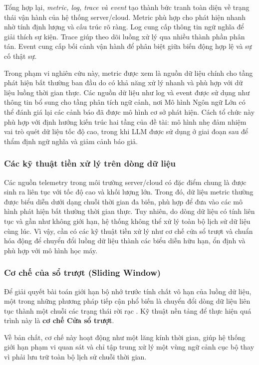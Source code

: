 Tổng hợp lại, \textit{metric, log, trace và event} tạo thành bức tranh toàn diện về trạng thái vận hành của hệ thống server/cloud. Metric phù hợp cho phát hiện nhanh nhờ tính định lượng và cấu trúc rõ ràng. Log cung cấp thông tin ngữ nghĩa để giải thích sự kiện. Trace giúp theo dõi luồng xử lý qua nhiều thành phần phân tán. Event cung cấp bối cảnh vận hành để phân biệt giữa biến động hợp lệ và sự cố thật sự.

Trong phạm vi nghiên cứu này, metric được xem là nguồn dữ liệu chính cho tầng phát hiện bất thường ban đầu do có khả năng xử lý nhanh và phù hợp với dữ liệu luồng thời gian thực. Các nguồn dữ liệu như log và event được sử dụng như thông tin bổ sung cho tầng phân tích ngữ cảnh, nơi Mô hình Ngôn ngữ Lớn có thể đánh giá lại các cảnh báo đã được mô hình cơ sở phát hiện. Cách tổ chức này phù hợp với định hướng kiến trúc hai tầng của đề tài: mô hình nhẹ đảm nhiệm vai trò quét dữ liệu tốc độ cao, trong khi LLM được sử dụng ở giai đoạn sau để thẩm định ngữ nghĩa và giảm cảnh báo giả.

\subsubsection{Các kỹ thuật tiền xử lý trên dòng dữ liệu}
    Các nguồn telemetry trong môi trường server/cloud có đặc điểm chung là được sinh ra liên tục với tốc độ cao và khối lượng lớn. Trong đó, dữ liệu metric thường được biểu diễn dưới dạng chuỗi thời gian đa biến, phù hợp để đưa vào các mô hình phát hiện bất thường thời gian thực. Tuy nhiên, do dòng dữ liệu có tính liên tục và gần như không giới hạn, hệ thống không thể xử lý toàn bộ lịch sử dữ liệu cùng lúc. Vì vậy, cần có các kỹ thuật tiền xử lý như cơ chế cửa sổ trượt và chuẩn hóa động để chuyển đổi luồng dữ liệu thành các biểu diễn hữu hạn, ổn định và phù hợp với mô hình học máy.
    
    \subsubsection*{Cơ chế của sổ trượt (Sliding Window)}
        
    Để giải quyết bài toán giới hạn bộ nhớ trước tính chất vô hạn của luồng dữ liệu, một trong những phương pháp tiếp cận phổ biến là chuyển đổi dòng dữ liệu liên tục thành một chuỗi các trạng thái rời rạc . Kỹ thuật nền tảng để thực hiện quá trình này là \textbf{cơ chế Cửa sổ trượt}. 
    
    Về bản chất, cơ chế này hoạt động như một lăng kính thời gian, giúp hệ thống giới hạn phạm vi quan sát và chỉ tập trung xử lý một vùng ngữ cảnh cục bộ thay vì phải lưu trữ toàn bộ lịch sử chuỗi thời gian.

